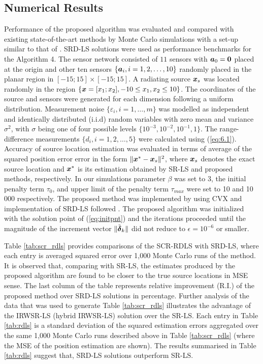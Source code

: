 \subsection{Numerical Results}

Performance of the proposed algorithm was evaluated and compared with existing state-of-the-art methods by Monte Carlo simulations with a set-up similar to that of \cite{BeckStLi}. SRD-LS solutions were used as performance benchmarks for the Algorithm 4. The sensor network consisted of $11$ sensors with $\mbox{\boldmath$a$}_0 = \mbox{\boldmath{$0$}}$ placed at the origin and other ten sensors  $\{\mbox{\boldmath$a$}_i, i = 1, 2,\ldots,10\}$ randomly placed in the planar region in $[-15;15]\times[-15;15]$. A radiating source $\mbox{\boldmath$x$}_s$ was located randomly in the region $\{\mbox{\boldmath$x$}=[x_1;x_2], -10\leq x_1,x_2\leq 10\}$. The coordinates of the source and sensors were generated for each dimension following a uniform distribution. Measurement noise $\{\varepsilon_i, i=1,\ldots,m\}$ was modelled as independent and identically distributed (i.i.d) random variables with zero mean and variance $\sigma^2$, with $\sigma$ being one of four possible levels $\{10^{-3}, 10^{-2}, 10^{-1}, 1\}$.  The range-difference measurements $\{d_i, i=1, 2,\ldots,5\}$ were calculated using (\ref{eq:6.1}). Accuracy of source location estimation was evaluated in terms of average of the squared position error error in the form $\|\mbox{\boldmath$x$}^*-\mbox{\boldmath$x$}_s\|^2$, where $\mbox{\boldmath$x$}_s$ denotes the exact source location and $\mbox{\boldmath$x$}^*$ is its estimation obtained by SR-LS and proposed methods, respectively.  
In our simulations parameter $\beta$ was set to 3, the initial penalty term $\tau_0$, and upper limit of the penalty term $\tau_{max}$ were set to 10 and 10 000 respectively. The proposed method was implemented by using  CVX  \cite{cvx} and implementation of SRD-LS followed \cite{BeckStLi}. The proposed algorithm was initialized with the solution point of (\ref{eq:initpnt}) and the iterations proceeded until the magnitude of the increment vector $\|\tilde{\mbox{\boldmath${\delta}$}}_k\|$ did not reduce to $\epsilon = 10^{-6}$ or smaller. 

Table \ref{tab:scr_rdls}  provides comparisons of the SCR-RDLS with SRD-LS, where each entry is averaged squared error over 1,000 Monte Carlo runs of the method. %
 It is observed that, comparing with SR-LS, the estimates produced by the proposed algorithm are found to be closer to the true source locations in MSE sense. The last column of the table  represents relative improvement (R.I.) of the proposed method over SRD-LS solutions in percentage. Further analysis of the data that was used to generate Table \ref{tab:scr_rdls} illustrates the advantage of the IRWSR-LS (hybrid IRWSR-LS) solution over the SR-LS. 
Each entry in Table \ref{tab:rdls} is a standard deviation of the squared  estimation errors  aggregated over the  same 1,000 Monte Carlo runs described above in Table \ref{tab:scr_rdls} (where the MSE of the position estimation are shown). The results summarised in Table \ref{tab:rdls} suggest that, SRD-LS solutions outperform SR-LS.

